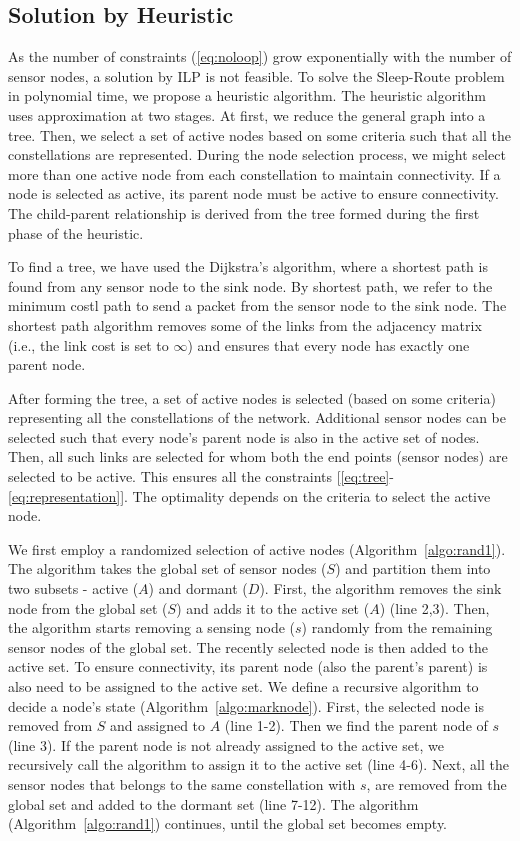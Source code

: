 \documentclass[conference]{IEEEtran}
\begin{document}
\subsection{Solution by Heuristic}
As the number of constraints (\ref{eq:noloop}) grow exponentially with the number of sensor nodes, a solution by ILP is not feasible. To solve the Sleep-Route problem in polynomial time, we propose a heuristic algorithm. The heuristic algorithm uses approximation at two stages. At first, we reduce the general graph into a tree. Then, we select a set of active nodes based on some criteria such that all the constellations are represented. During the node selection process, we might select more than one active node from each constellation to maintain connectivity. If a node is selected as active, its parent node must be active to ensure connectivity. The child-parent relationship is derived from the tree formed during the first phase of the heuristic.

To find a tree, we have used the Dijkstra's algorithm, where a shortest path is found from any sensor node to the sink node. By shortest path, we refer to the minimum costl path to send a packet from the sensor node to the sink node. The shortest path algorithm removes some of the links from the adjacency matrix (i.e., the link cost is set to $\infty$) and ensures that every node has exactly one parent node.

After forming the tree, a set of active nodes is selected (based on some criteria) representing all the constellations of the network. Additional sensor nodes can be selected such that every node's parent node is also in the active set of nodes. Then, all such links are selected for whom both the end points (sensor nodes) are selected to be active. This ensures all the constraints [\ref{eq:tree}-\ref{eq:representation}]. The optimality depends on the criteria to select the active node.

We first employ a randomized selection of active nodes (Algorithm~\ref{algo:rand1}). The algorithm takes the global set of sensor nodes ($S$) and partition them into two subsets - active ($A$) and dormant ($D$). First, the algorithm removes the sink node from the global set ($S$) and adds it to the active set ($A$) (line 2,3). Then, the algorithm starts removing a sensing node ($s$) randomly from the remaining sensor nodes of the global set. The recently selected node is then added to the active set. To ensure connectivity, its parent node (also the parent's parent) is also need to be assigned to the active set. We define a recursive algorithm to decide a node's state (Algorithm~\ref{algo:marknode}). First, the selected node is removed from $S$ and assigned to $A$ (line 1-2). Then we find the parent node of $s$ (line 3). If the parent node is not already assigned to the active set, we recursively call the algorithm to assign it to the active set (line 4-6). Next, all the sensor nodes that belongs to the same constellation with $s$, are removed from the global set and added to the dormant set (line 7-12). The algorithm (Algorithm~\ref{algo:rand1}) continues, until the global set becomes empty.
\end{document}
